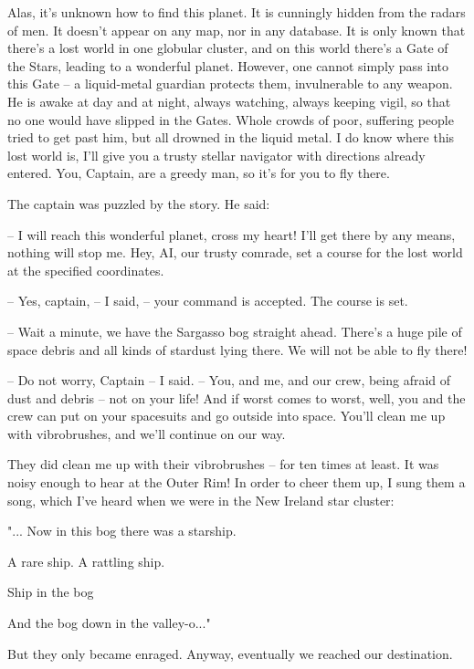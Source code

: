 \documentclass[ebook,twoside,final,openright]{memoir}
\begin{document}
Alas, it’s unknown how to find this planet. It is cunningly hidden from the radars of men. It doesn’t appear on any map, nor in any database. It is only known that there’s a lost world in one globular cluster, and on this world there’s a Gate of the Stars, leading to a wonderful planet. However, one cannot simply pass into this Gate – a liquid-metal guardian protects them, invulnerable to any weapon. He is awake at day and at night, always watching, always keeping vigil, so that no one would have slipped in the Gates. Whole crowds of poor, suffering people tried to get past him, but all drowned in the liquid metal. I do know where this lost world is, I'll give you a trusty stellar navigator with directions already entered. You, Captain, are a greedy man, so it’s for you to fly there.\par
\par
The captain was puzzled by the story. He said:\par
– I will reach this wonderful planet, cross my heart! I'll get there by any means, nothing will stop me. Hey, AI, our trusty comrade, set a course for the lost world at the specified coordinates.\par
– Yes, captain, – I said, – your command is accepted. The course is set.\par
– Wait a minute, we have the Sargasso bog straight ahead. There's a huge pile of space debris and all kinds of stardust lying there. We will not be able to fly there!\par
– Do not worry, Captain – I said. – You, and me, and our crew, being afraid of dust and debris – not on your life! And if worst comes to worst, well, you and the crew can put on your spacesuits and go outside into space. You’ll clean me up with vibrobrushes, and we’ll continue on our way.\par
\par
They did clean me up with their vibrobrushes – for ten times at least. It was noisy enough to hear at the Outer Rim! In order to cheer them up, I sung them a song, which I’ve heard when we were in the New Ireland star cluster: \par
"... Now in this bog there was a starship.\par
A rare ship. A rattling ship.\par
Ship in the bog\par
And the bog down in the valley-o..."\par
 But they only became enraged. Anyway, eventually we reached our destination.\par
\end{document}
